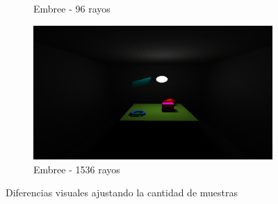 \begin{figure}[H]
\begin{subfigure}{0.45\textwidth}
		\caption{Embree - 96 rayos}
	\end{subfigure}
	\begin{subfigure}{0.45\textwidth}
		\includegraphics[width=1\linewidth]{assets/512srt}
		\caption{Embree - 1536 rayos}
	\end{subfigure}
	\caption{Diferencias visuales ajustando la cantidad de muestras}
	\label{img:difres}
\end{figure}

